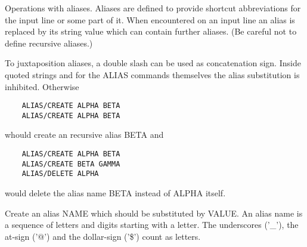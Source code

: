 \ENDCMD
{}
\ifMENUtext
   \par
Operations with aliases.  Aliases are defined to provide shortcut 
   abbreviations for the input line or some part of it.  When encountered on 
   an input line an alias is replaced by its string value which can contain 
   further aliases.  (Be careful not to define recursive aliases.) 

   \par
To juxtaposition aliases, a double slash can be used as concatenation sign. 
   Inside quoted strings and for the ALIAS commands themselves the alias 
   substitution is inhibited.  Otherwise 
\begin{verbatim}
    ALIAS/CREATE ALPHA BETA
    ALIAS/CREATE ALPHA BETA
\end{verbatim}
   \par
whould create an recursive alias BETA and 
\begin{verbatim}
    ALIAS/CREATE ALPHA BETA
    ALIAS/CREATE BETA GAMMA
    ALIAS/DELETE ALPHA
\end{verbatim}
   \par
would delete the alias name BETA instead of ALPHA itself.  


\fi


\BEGARG
{}
\ENDARG
{}
\ENDOPT

   \par
Create an alias NAME which should be substituted by VALUE.  An alias name 
   is a sequence of letters and digits starting with a letter.  The 
   underscores ('\_'), the at-sign ('@') and the dollar-sign ('\$') count as 
   letters.  

